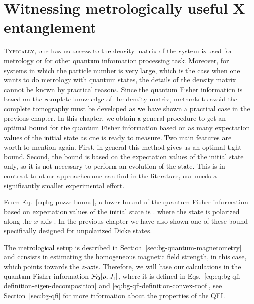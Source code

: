 \section[Witnessing metrologically useful entanglement]
{Witnessing metrologically useful {\color{grey} X} entanglement}
\label{sec:lt}



\lettrine[lines=2, findent=3pt,nindent=0pt]{T}{ypically}, one has no access to the density matrix of the system is used for metrology or for other quantum information processing task.
Moreover, for systems in which the particle number is very large, which is the case when one wants to do metrology with quantum states, the details of the density matrix cannot be known by practical reasons.
Since the quantum Fisher information is based on the complete knowledge of the density matrix, methods to avoid the complete tomography must be developed as we have shown a practical case in the previous chapter.
In this chapter, we obtain a general procedure to get an optimal bound for the quantum Fisher information based on as many expectation values of the initial state as one is ready to measure.
Two main features are worth to mention again.
First, in general this method gives us an optimal tight bound.
Second, the bound is based on the expectation values of the initial state only, so it is not necessary to perform an evolution of the state.
This is in contrast to other approaches one can find in the literature, our needs a significantly smaller experimental effort.

From Eq.~\eqref{eq:bg-pezze-bound}, a lower bound of the quantum Fisher information based on expectation values of the initial state is
\be
   \geqslant {}.
\ee
where the state is polarized along the $x$-axis \cite{Pezze2009}.
In the previous chapter we have also shown one of these bound specifically designed for unpolarized Dicke states.

The metrological setup is described in Section~\ref{sec:bg-quantum-magnetometry} and consists in estimating the homogeneous magnetic field strength, in this case, which points towards the $z$-axis.
Therefore, we will base our calculations in the quantum Fisher information $\mathcal{F}_{\textnormal{Q}}[{\textstyle \rho, J_z}]$, where it is defined in Eqs.~\eqref{eq:eq:bg-qfi-definition-eigen-decomposition} and \eqref{eq:bg-qfi-definition-convex-roof}, see Section~\ref{sec:bg-qfi} for more information about the properties of the QFI.


